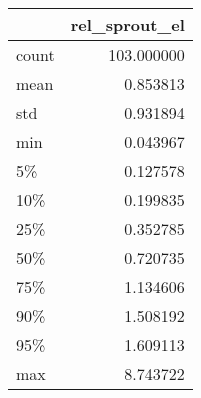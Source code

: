 \begin{tabular}{lr}
\toprule
{} &  rel\_sprout\_el \\
\midrule
count &     103.000000 \\
mean  &       0.853813 \\
std   &       0.931894 \\
min   &       0.043967 \\
5\%    &       0.127578 \\
10\%   &       0.199835 \\
25\%   &       0.352785 \\
50\%   &       0.720735 \\
75\%   &       1.134606 \\
90\%   &       1.508192 \\
95\%   &       1.609113 \\
max   &       8.743722 \\
\bottomrule
\end{tabular}
